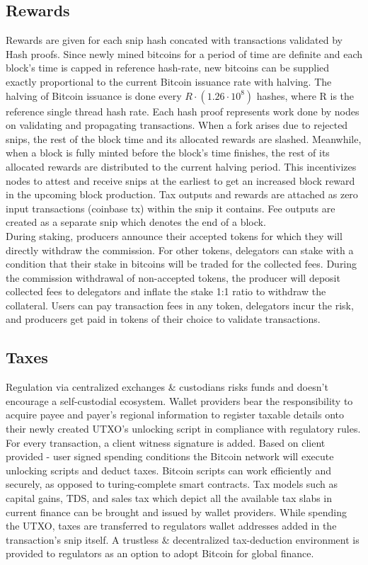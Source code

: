 \documentclass[a4paper,	10pt]{extarticle}
\begin{document}
\subsection{Rewards}
Rewards are given for each snip hash concated with transactions validated by Hash proofs. Since newly mined bitcoins for a period of time are definite and each block's time is capped in reference hash-rate, new bitcoins can be supplied exactly proportional to the current Bitcoin issuance rate with halving. The halving of Bitcoin issuance is done every $R \cdot (1.26 \cdot 10^8)$ hashes, where R is the reference single thread hash rate. Each hash proof represents work done by nodes on validating and propagating transactions. When a fork arises due to rejected snips, the rest of the block time and its allocated rewards are slashed. Meanwhile, when a block is fully minted before the block's time finishes, the rest of its allocated rewards are distributed to the current halving period. This incentivizes nodes to attest and receive snips at the earliest to get an increased block reward in the upcoming block production. Tax outputs and rewards are attached as zero input transactions (coinbase tx) within the snip it contains. Fee outputs are created as a separate snip which denotes the end of a block.\\


During staking, producers announce their accepted tokens for which they will directly withdraw the commission. For other tokens, delegators can stake with a condition that their stake in bitcoins will be traded for the collected fees. During the commission withdrawal of non-accepted tokens, the producer will deposit collected fees to delegators and inflate the stake 1:1 ratio to withdraw the collateral. Users can pay transaction fees in any token, delegators incur the risk, and producers get paid in tokens of their choice to validate transactions.
\subsection{Taxes}
Regulation via centralized exchanges \& custodians risks funds and doesn't encourage a self-custodial ecosystem. Wallet providers bear the responsibility to acquire payee and payer's regional information to register taxable details onto their newly created UTXO's unlocking script in compliance with regulatory rules. For every transaction, a client witness signature is added. Based on client provided - user signed spending conditions the Bitcoin network will execute unlocking scripts and deduct taxes. Bitcoin scripts can work efficiently and securely, as opposed to turing-complete smart contracts. Tax models such as capital gains, TDS, and sales tax which depict all the available tax slabs in current finance can be brought and issued by wallet providers. While spending the UTXO, taxes are transferred to regulators wallet addresses added in the transaction's snip itself. A trustless \& decentralized tax-deduction environment is provided to regulators as an option to adopt Bitcoin for global finance.
\end{document}
